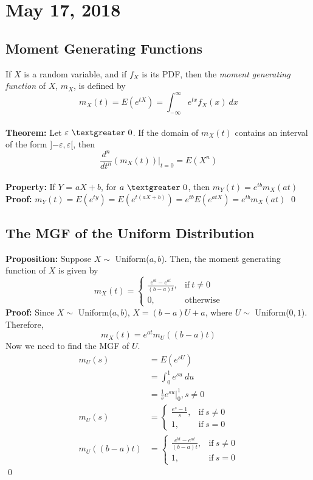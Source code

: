 \documentclass{article}
\newcommand{\ti}[1]{\textit{#1}}
\newcommand{\tb}[1]{\textbf{#1}}
\newcommand{\ep}{\varepsilon}
\newcommand{\gt}{\textgreater}
\begin{document}
\section{May 17, 2018}
\subsection{Moment Generating Functions}
If $X$ is a random variable, and if $f_{X}$ is its PDF, then the \ti{moment generating function} of $X$, $m_{X}$, is defined by
\[m_{X}(t) = E(e^{tX}) = \int_{-\infty}^{\infty} e^{tx}f_{X}(x)\ dx\]\\
\tb{Theorem:} Let $\ep\ \gt\ 0$. If the domain of $m_{X}(t)$ contains an interval of the form ]$-\ep, \ep$[, then
\[\frac{d^{n}}{dt^{n}}(m_{X}(t))\Big\rvert_{t=0} = E(X^{n})\]\\
\tb{Property:} If $Y$ = $aX+b$, for $a\ \gt\ 0$, then $m_{Y}(t) = e^{tb}m_{X}(at)$\\
\tb{Proof:} $m_{Y}(t) = E(e^{ty}) = E(e^{t(aX+b)}) = e^{tb}E(e^{atX}) = e^{tb}m_{X}(at)$
\qed
\subsection{The MGF of the Uniform Distribution}
\tb{Proposition:} Suppose $X \sim$ Uniform($a, b$). Then, the moment generating function of $X$ is given by
\[m_{X}(t) =
\begin{cases}
	\frac{e^{bt}-e^{at}}{(b-a)t}, &\text{if}\ t \neq 0\\
	0, &\text{otherwise} 
\end{cases}
\]
\tb{Proof:} Since $X \sim$ Uniform($a, b$), $X=(b-a)U + a$, where $U \sim$ Uniform($0, 1$). Therefore,
\[m_{X}(t)=e^{at}m_{U}((b-a)t)\]
Now we need to find the MGF of $U$.
\begin{align*}
	m_{U}(s) &= E(e^{sU})\\
			&= \int_{0}^{1} e^{su}\ du\\
			&= \frac{1}{s}e^{su}\Big\rvert_{0}^{1}, s \neq 0\\
	m_{U}(s)	&=
				\begin{cases}
					\frac{e^{s}-1}{s}, &\text{if}\ s \neq 0\\
					1, &\text{if}\ s = 0
				\end{cases}\\
	m_{U}((b-a)t) &= 
				\begin{cases}
					\frac{e^{bt}-e^{at}}{(b-a)t}, &\text{if}\ s \neq 0\\
					1, &\text{if}\ s = 0
				\end{cases}
\end{align*}
\qed
\end{document}
